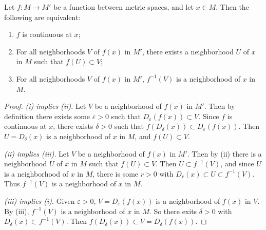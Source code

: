 \documentclass[a4paper]{scrartcl}
\begin{document}
\begin{proposition}
    Let $f: M \rightarrow M'$ be a function between metric spaces, and let $x \in M$. Then the following are equivalent:
    \begin{enumerate}[label=(\roman*)]
        \item $f$ is continuous at $x$;
        \item For all neighborhoods $V$ of $f(x)$ in $M'$, there exists a neighborhood $U$ of $x$ in $M$ such that $f(U) \subset V$;
        \item For all neighborhoods $V$ of $f(x)$ in $M'$, $f^{-1}(V)$ is a neighborhood of $x$ in $M$.
    \end{enumerate}
\end{proposition}
\begin{proof}
    \emph{(i) implies (ii)}. Let $V$ be a neighborhood of $f(x)$ in $M'$. Then by definition there exists some $\varepsilon > 0$ such that $D_{\varepsilon}(f(x)) \subset V$. Since $f$ is continuous at $x$, there exists $\delta > 0$ such that $f(D_{\delta}(x)) \subset D_\varepsilon(f(x))$. Then $U = D_{\delta}(x)$ is a neighborhood of $x$ in $M$, and $f(U) \subset V$.

    \emph{(ii) implies (iii)}. Let $V$ be a neighborhood of $f(x)$ in $M'$. Then by (ii) there is a neighborhood $U$ of $x$ in $M$ such that $f(U) \subset V$. Then $U \subset f^{-1}(V)$, and since $U$ is a neighborhood of $x$ in $M$, there is some $r > 0$ with $D_r(x) \subset U \subset f^{-1}(V)$. Thus $f^{-1}(V)$ is a neighborhood of $x$ in $M$.

    \emph{(iii) implies (i)}.
    Given $\varepsilon > 0$, $V = D_{\varepsilon}(f(x))$ is a neighborhood of $f(x)$ in $V$. By (iii), $f^{-1}(V)$ is a neighborhood of $x$ in $M$. So there exits $\delta > 0$ with $D_{\delta}(x) \subset f^{-1}(V)$. Then $f(D_{\delta}(x)) \subset V = D_{\delta}(f(x))$.
\end{proof}
\end{document}
